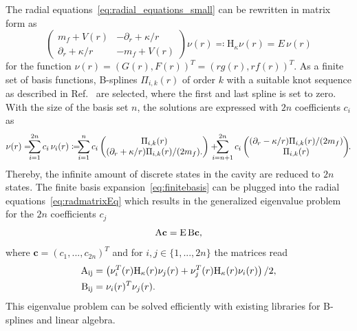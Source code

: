 The radial equations~\eqref{eq:radial_equations_small} can be rewritten in matrix form as
\begin{equation}
\begin{pmatrix}
m_f+V(r)&-\partial_r + \kappa/r\\
\partial_r + \kappa/r&-m_f+V(r)
\end{pmatrix}
\nu(r)\eqqcolon\mathrm{H}_\kappa \nu(r)
= E\,\nu(r)
\label{eq:radmatrixEq}
\end{equation}
for the function $\nu(r)=(G(r),F(r))^T=(r g(r),r f(r))^T$. As a finite set of basis functions, B-splines $\Pi_{i,k}(r)$ of order $k$  with a suitable knot sequence as described in Ref.~\cite{johnson1988} are selected, where the first and last spline is set to zero. With the size of the basis set $n$, the solutions are expressed with $2n$ coefficients $c_i$ as
\begin{equation}
\nu(r)=\hspace{-0.2cm}\sum_{i=1}^{2n}c_i\,\nu_i(r)\coloneqq \hspace{-0.2cm}\sum_{i=1}^n
c_i\begin{pmatrix}
\Pi_{i,k}(r)\\
(\partial_r +\kappa/r)\Pi_{i,k}(r)/(2m_f).
\end{pmatrix}
+\hspace{-0.3cm}
\sum_{i=n+1}^{2n}c_i
\begin{pmatrix}
(\partial_r -\kappa/r)\Pi_{i,k}(r)/(2m_f)\\
\Pi_{i,k}(r)
\end{pmatrix}\hspace{-0.1cm}.
\label{eq:finitebasis}
\end{equation}
Thereby, the infinite amount of discrete states in the cavity are reduced to $2n$ states. The finite basis expansion~\eqref{eq:finitebasis} can be plugged into the radial equations~\eqref{eq:radmatrixEq} which results in the generalized eigenvalue problem~\cite{Shabaev2004} for the $2n$ coefficients $c_j$
\begin{equation}
\rm{A}\mathbf{c}= E\, \rm{B} \mathbf{c},
\label{eq:eigenvals}
\end{equation}
where $\mathbf{c}=(c_1,...,c_{2n})^{T}$ and for $i,j\in \{1,...,2n\}$ the matrices read
\begin{align}
\rm{A}_{ij} &= \left(\nu_i^T(r)\mathrm{H}_\kappa(r)\nu_j(r)+\nu_j^T(r)\mathrm{H}_\kappa(r)\nu_i(r)\right)/2,\\
\rm{B}_{ij} &= \nu_i(r)^T\nu_j(r).
\end{align}
This eigenvalue problem can be solved efficiently with existing libraries for B-splines and linear algebra. \\
